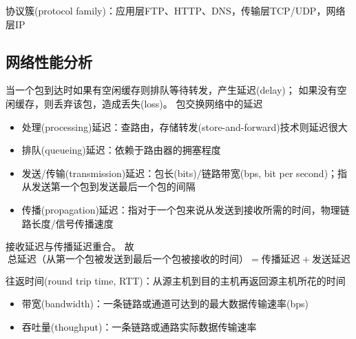 
协议簇(protocol family)：应用层FTP、HTTP、DNS，传输层TCP/UDP，网络层IP

\subsection{网络性能分析}
当一个包到达时如果有空闲缓存则排队等待转发，产生延迟(delay)；
如果没有空闲缓存，则丢弃该包，造成丢失(loss)。
包交换网络中的延迟
\begin{itemize}
	\item 处理(processing)延迟：查路由，存储转发(store-and-forward)技术则延迟很大
	\item 排队(queueing)延迟：依赖于路由器的拥塞程度
	\item 发送/传输(transmission)延迟：包长(bits)/链路带宽(bps, bit per second)；指从发送第一个包到发送最后一个包的间隔
	\item 传播(propagation)延迟：指对于一个包来说从发送到接收所需的时间，物理链路长度/信号传播速度
\end{itemize}

接收延迟与传播延迟重合。
故
\[\text{总延迟（从第一个包被发送到最后一个包被接收的时间）}=\text{传播延迟}+\text{发送延迟}\]

往返时间(round trip time, RTT)：从源主机到目的主机再返回源主机所花的时间

\begin{itemize}
	\item 带宽(bandwidth)：一条链路或通道可达到的最大数据传输速率(bps)
	\item 吞吐量(thoughput)：一条链路或通路实际数据传输速率
\end{itemize}